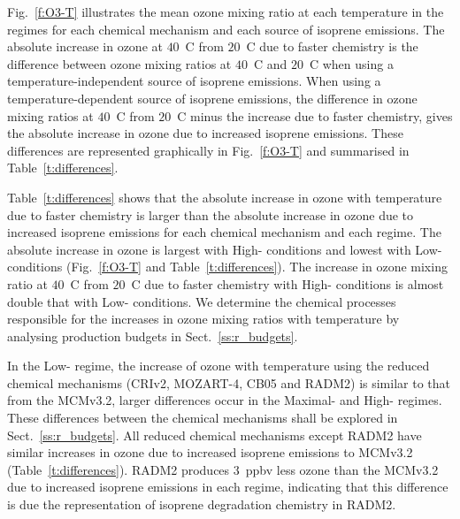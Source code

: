 Fig.~\ref{f:O3-T} illustrates the mean ozone mixing ratio at each temperature in the  regimes for each chemical mechanism and each source of isoprene emissions.  
The absolute increase in ozone at $40$~\degree C from $20$~\degree C due to faster chemistry is the difference between ozone mixing ratios at $40$~\degree C and $20$~\degree C when using a temperature-independent source of isoprene emissions.
When using a temperature-dependent source of isoprene emissions, the difference in ozone mixing ratios at $40$~\degree C from $20$~\degree C minus the increase due to faster chemistry, gives the absolute increase in ozone due to increased isoprene emissions.
These differences are represented graphically in Fig.~\ref{f:O3-T} and summarised in Table~\ref{t:differences}.

Table~\ref{t:differences} shows that the absolute increase in ozone with temperature due to faster chemistry is larger than the absolute increase in ozone due to increased isoprene emissions for each chemical mechanism and each  regime.
The absolute increase in ozone is largest with High- conditions and lowest with Low- conditions (Fig.~\ref{f:O3-T} and Table~\ref{t:differences}).
The increase in ozone mixing ratio at $40$~\degree C from $20$~\degree C due to faster chemistry with High- conditions is almost double that with Low- conditions.
We determine the chemical processes responsible for the increases in ozone mixing ratios with temperature by analysing  production budgets in Sect.~\ref{ss:r_budgets}.

In the Low- regime, the increase of ozone with temperature using the reduced chemical mechanisms (CRIv2, MOZART-4, CB05 and RADM2) is similar to that from the MCMv3.2, larger differences occur in the Maximal- and High- regimes.
These differences between the chemical mechanisms shall be explored in Sect.~\ref{ss:r_budgets}.
All reduced chemical mechanisms except RADM2 have similar increases in ozone due to increased isoprene emissions to MCMv3.2 (Table~\ref{t:differences}).
RADM2 produces $3$~ppbv less ozone than the MCMv3.2 due to increased isoprene emissions in each  regime, indicating that this difference is due the representation of isoprene degradation chemistry in RADM2.

